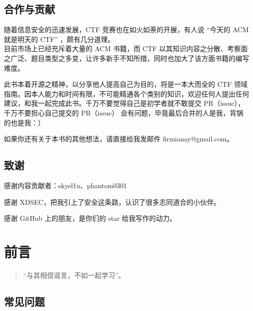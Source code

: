 \section{合作与贡献}
\indent \setlength{\parindent}{2em}

    \indent 随着信息安全的迅速发展，CTF 竞赛也在如火如荼的开展，有人说 “今天的 ACM 就是明天的 CTF” ，颇有几分道理。
    \\目前市场上已经充斥着大量的 ACM 书籍，而 CTF 以其知识内容之分散、考察面之广泛、题目类型之多变，让许多新手不知所措，同时也加大了该方面书籍的编写难度。

    \indent 此书本着开源之精神，以分享他人提高自己为目的，将是一本大而全的 CTF 领域指南。因本人能力和时间有限，不可能精通各个类别的知识，欢迎任何人提出任何建议，和我一起完成此书。千万不要觉得自己是初学者就不敢提交 PR（issue），千万不要担心自己提交的 PR（issue） 会有问题，毕竟最后合并的人是我，背锅的也是我：）

    \indent 如果你还有关于本书的其他想法，请直接给我发邮件 firmianay@gmail.com。

\section{致谢}
\indent \setlength{\parindent}{2em}

\indent 感谢内容贡献者：skyel1u、phantom0301

\indent 感谢 XDSEC，把我引上了安全这条路，认识了很多志同道合的小伙伴。

\indent 感谢 GitHub 上的朋友，是你们的 star 给我写作的动力。
\chapter{前言}

\begin{quote}
    “与其相信谣言，不如一起学习”。
\end{quote}

\section{常见问题}

